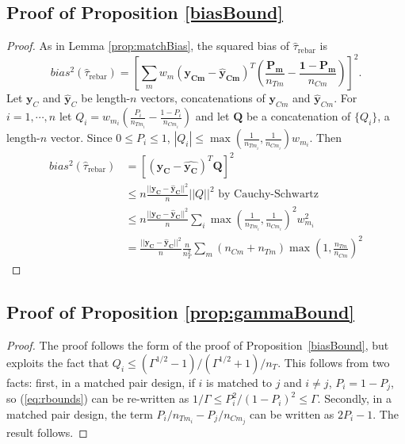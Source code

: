 \documentclass[12pt]{article}\usepackage[]{graphicx}\usepackage[]{color}
\newcommand{\ncm}{n_{Cm}}
\newcommand{\ntm}{n_{Tm}}
\newcommand{\est}{\hat{\tau}_{\text{rebar}}}
\newcommand{\match}{m}
\begin{document}
\subsection{Proof of Proposition \ref{biasBound}}
\begin{proof}
As in Lemma \ref{prop:matchBias}, the squared bias of $\est$ is
\begin{equation*}
bias^2(\est)=\left[ \sum_m
w_m(\bm{y_{Cm}}-\bm{\hat{y}_{Cm}})^T\left(\frac{\bm{P_m}}{\ntm}-\frac{\bm{1}-\bm{P_m}}{\ncm}\right)\right]^2.
\end{equation*}
Let $\bm{y}_C$ and $\hat{\bm{y}}_C$ be length-$n$ vectors,
concatenations of $\bm{y}_{Cm}$ and $\hat{\bm{y}}_{Cm}$. For $i=1,\cdots,n$ let
$Q_i=w_{\match_i}\left(\frac{P_i}{n_{T\match_i}}-\frac{1-P_{i}}{n_{C\match_i}}\right)$
and let $\bm{Q}$ be a concatenation of $\{Q_i\}$, a length-$n$ vector.
Since $0\le P_i\le 1$, $|Q_i|\le
\max\left(\frac{1}{n_{T\match_i}},\frac{1}{n_{C\match_i}}\right)w_{\match_i}$.
Then
\begin{align*}
  bias^2(\est)&=\left[(\bm{y_C}-\bm{\hat{y_{C}}})^T\bm{Q}\right]^2\\
  &\le n\frac{||\bm{y_C}-\bm{\hat{y}_C}||^2}{n} ||Q||^2
  \text{ by Cauchy-Schwartz}\\
  &\le n\frac{||\bm{y_C}-\bm{\hat{y}_C}||^2}{n} \sum_i \max\left(\frac{1}{n_{T\match_i}},\frac{1}{n_{C\match_i}}\right)^2w_{\match_i}^2\\
  &=\frac{||\bm{y_C}-\bm{\hat{y}_C}||^2}{n} \frac{n}{n_T^2}\sum_m
  (\ncm+\ntm) \max\left(1,\frac{\ntm}{\ncm}\right)^2
  \end{align*}
\end{proof}


\subsection{Proof of Proposition \ref{prop:gammaBound}}
\begin{proof}
  The proof follows the form of the proof of
  Proposition~\ref{biasBound}, but exploits the fact that $Q_i\le
  (\Gamma^{1/2}-1)/(\Gamma^{1/2}+1)/n_T$. This follows from two facts:
  first, in a matched pair design, if $i$ is matched to $j$ and $i\ne
  j$, $P_i=1-P_j$, so (\ref{eq:rbounds}) can be re-written as
  $1/\Gamma\le P_i^2/(1-P_i)^2\le \Gamma$. Secondly, in a matched pair
  design, the term $P_i/n_{T\match_i}-P_j/n_{C\match_j}$ can be
  written as $2P_i-1$. The result follows.
\end{proof}
\end{document}

